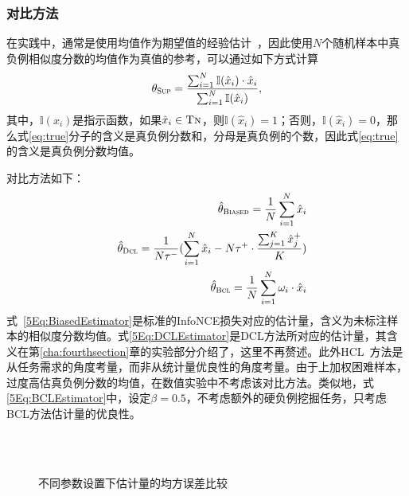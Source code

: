 \subsubsection{对比方法}
在实践中，通常是使用均值作为期望值的经验估计~\cite{Oord:2018:arxiv,Chuang:2020:NIPS,Chen:2020:ICML}，因此使用$N$个随机样本中真负例相似度分数的均值作为真值的参考，可以通过如下方式计算
\begin{equation}\label{eq:true}
	\theta_{\textsc{Sup}} = \frac{\sum_{i=1}^N \mathbb{I}(\hat x_i) \cdot \hat{x}_i  }{ \sum_{i=1}^N \mathbb I(\hat{x}_i) },
\end{equation}
其中，$\mathbb{I}(x_i)$是指示函数，如果$\hat{x}_i \in \textsc{Tn}$，则$\mathbb{I}(\hat x_i)=1$；否则，$\mathbb{I}(\hat x_i)=0$，那么式\eqref{eq:true}分子的含义是真负例分数和，分母是真负例的个数，因此式\eqref{eq:true}的含义是真负例分数均值。

对比方法如下：
\begin{eqnarray}
	&&\hat{\theta}_\textsc{Biased} =\frac{1}{N} \sum_{i=1}^{N} \hat{x}_i \label{5Eq:BiasedEstimator} \\
	&&\hat{\theta}_\textsc{Dcl} =  \frac{1}{N\tau^-}  (\sum_{i=1}^{N} \hat{x}_i - N\tau^+ \cdot \frac{\sum_{j=1}^{K} \hat{x}_j^+}{K} ) \label{5Eq:DCLEstimator} \\
	&& \hat\theta_\textsc{Bcl} =\frac{1}{N}  \sum_{i=1}^N \omega_i \cdot \hat{x}_i\label{5Eq:BCLEstimator}
\end{eqnarray}
式~\eqref{5Eq:BiasedEstimator}是标准的InfoNCE损失\cite{Oord:2018:arxiv}对应的估计量，含义为未标注样本的相似度分数均值。式\eqref{5Eq:DCLEstimator}是DCL\cite{Chuang:2020:NIPS}方法所对应的估计量，其含义在第\ref{cha:fourthsection}章的实验部分介绍了，这里不再赘述。此外HCL~\cite{Robinson:2021:ICLR}方法是从任务需求的角度考量，而非从统计量优良性的角度考量。由于上加权困难样本，过度高估真负例分数的均值，在数值实验中不考虑该对比方法。类似地，式\eqref{5Eq:BCLEstimator}中，设定$\beta=0.5$，不考虑额外的硬负例挖掘任务，只考虑BCL方法估计量的优良性。
\begin{figure*}[h!]
	\centering
	\\
	\\
	\caption{不同参数设置下估计量的均方误差比较}
	\label{Fig:MSE}
\end{figure*}


